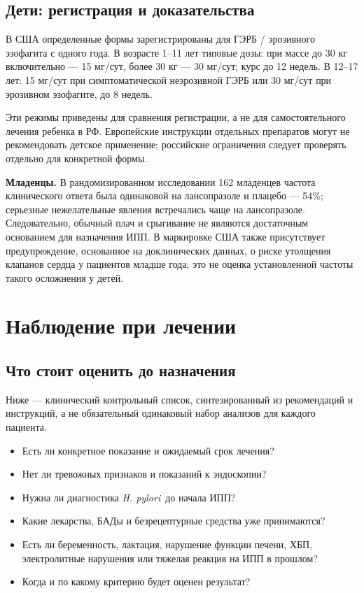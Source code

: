 \documentclass[11pt,a4paper,notitlepage]{report}
\newcommand{\Hp}{\textit{H. pylori}}
\newcommand{\src}[1]{\unskip\space\cite{#1}}
\begin{document}
\subsection{Дети: регистрация и доказательства}
В США определенные формы зарегистрированы для ГЭРБ / эрозивного эзофагита с одного года. В возрасте 1--11 лет типовые дозы: при массе до 30 кг включительно --- 15 мг/сут, более 30 кг --- 30 мг/сут; курс до 12 недель. В 12--17 лет: 15 мг/сут при симптоматической неэрозивной ГЭРБ или 30 мг/сут при эрозивном эзофагите, до 8 недель.\src{uslabel}

Эти режимы приведены для сравнения регистрации, а не для самостоятельного лечения ребенка в РФ. Европейские инструкции отдельных препаратов могут не рекомендовать детское применение; российские ограничения следует проверять отдельно для конкретной формы.\src{emc,grls}

\textbf{Младенцы.} В рандомизированном исследовании 162 младенцев частота клинического ответа была одинаковой на лансопразоле и плацебо --- 54\%; серьезные нежелательные явления встречались чаще на лансопразоле. Следовательно, обычный плач и срыгивание не являются достаточным основанием для назначения ИПП. В маркировке США также присутствует предупреждение, основанное на доклинических данных, о риске утолщения клапанов сердца у пациентов младше года; это не оценка установленной частоты такого осложнения у детей.\src{infant,uslabel}

\section{Наблюдение при лечении}
\label{sec:monitoring}

\subsection{Что стоит оценить до назначения}
Ниже --- клинический контрольный список, синтезированный из рекомендаций и инструкций, а не обязательный одинаковый набор анализов для каждого пациента.\src{agagerd,agadepres,uslabel}
\begin{itemize}
\item Есть ли конкретное показание и ожидаемый срок лечения?
\item Нет ли тревожных признаков и показаний к эндоскопии?
\item Нужна ли диагностика \Hp\ до начала ИПП?
\item Какие лекарства, БАДы и безрецептурные средства уже принимаются?
\item Есть ли беременность, лактация, нарушение функции печени, ХБП, электролитные нарушения или тяжелая реакция на ИПП в прошлом?
\item Когда и по какому критерию будет оценен результат?
\end{itemize}
\end{document}
